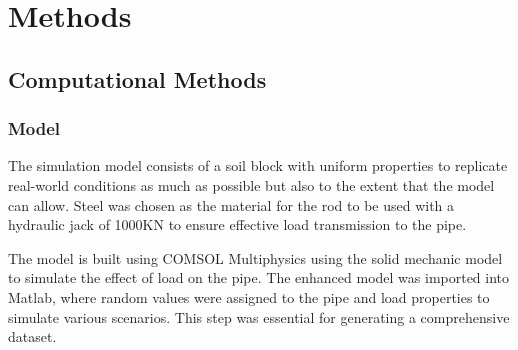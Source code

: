 
\chapter{Methods}
\noindent
\section{Computational Methods}
\label{sec:compmeth}

\subsection{Model}
\label{sec:model}
The simulation model consists of a soil block with uniform properties to replicate real-world conditions as much as possible but also to the extent that the model can allow. Steel was chosen as the material for the rod to be used with a hydraulic jack of 1000KN to ensure effective load transmission to the pipe.

The model is built using COMSOL Multiphysics using the solid mechanic model to simulate the effect of load on the pipe. The enhanced model was imported into Matlab, where random values were assigned to the pipe and load properties to simulate various scenarios. This step was essential for generating a comprehensive dataset.

